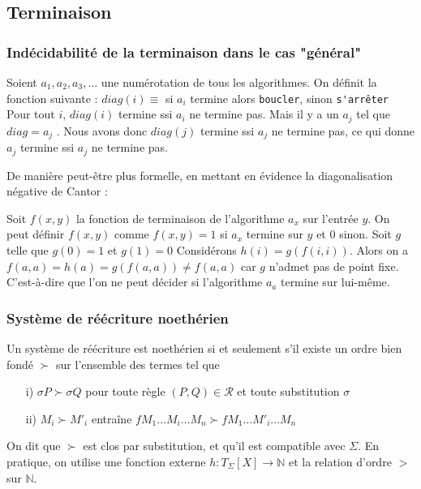 \documentclass[11pt]{book}
\begin{document}
\subsection{Terminaison}
\subsubsection{Indécidabilité de la terminaison dans le cas "général"}
Soient $a_1,a_2 ,a_3 , \dots$ une numérotation de tous les algorithmes.
On définit la fonction suivante : $diag(i) ≡$ si $a_i$ termine alors \verb+boucler+, sinon \verb+s'arrêter+ \\

Pour tout $i$, $diag(i)$ termine ssi $a_i$ ne termine pas.
Mais il y a un $a_j$ tel que $diag = a_j$ . Nous avons donc
$diag(j)$ termine ssi $a_j$ ne termine pas, ce qui donne
$a_j$ termine ssi $a_j$ ne termine pas.



De manière peut-être plus formelle, en mettant en évidence la diagonalisation négative de Cantor :

Soit $f(x,y)$ la fonction de terminaison de l'algorithme $a_x$ sur l'entrée $y$.
On peut définir $f(x,y)$ comme $f(x,y) = 1$ si $a_x$ termine sur $y$ et $0$ sinon.
Soit $g$ telle que $g(0) = 1$ et $g(1) = 0$ 
Considérons $h(i) = g(f(i,i))$.
Alors on a $f(a,a) = h(a) = g(f(a,a)) \neq f(a,a)$ car $g$ n'admet pas de point fixe.
C'est-à-dire que l'on ne peut décider si l'algorithme $a_a$ termine sur lui-même. 

\subsubsection{Système de réécriture noethérien}
Un système de réécriture est noethérien si et seulement s'il existe un ordre bien fondé
$\succ$ sur l'ensemble des termes tel que
\begin{itemize}
	\item[i)] $\sigma P \succ \sigma Q$ pour toute règle $(P,Q) \in \mathcal{R}$ et toute substitution $\sigma$
	\item[ii)] $M_i \succ M'_i$ entraîne $ fM_1\dots M_i \dots M_n \succ fM_1\dots M'_i \dots M_n $
\end{itemize}

On dit que $\succ$ est clos par substitution, et qu'il est compatible avec $\Sigma$.
\vspace{0.2cm}
En pratique, on utilise une fonction externe $h : T_\Sigma [X] \rightarrow \mathbb{N} $ et la relation d'ordre $>$ sur 
$\mathbb{N}$.
\end{document}
